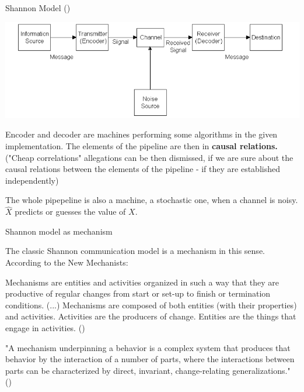 \documentclass[10pt, aspectratio=169, handout]{beamer}
\begin{document}
\begin{frame}[label=shannon_model]{ Shannon Model (\cite{shannon_mathematical_1948})}

    \includegraphics[width=1\linewidth]{images/latexImage_9d58f9e54772e4e91104b2b791c5c63e.png}
    


Encoder and decoder are  machines performing some algorithms  in the given implementation.
The elements of the pipeline are then in \textbf{causal relations.} ("Cheap correlations" allegations can be then dismissed, if we are sure about the causal relations between the elements of the pipeline - if they are established independently)

    The whole pipepeline is also a machine, a stochastic one, when a channel is noisy.
    {$\hat{X}$} predicts or guesses the value of $X$.
   

\end{frame}


\begin{frame}[label=shannon_mechanism]{Shannon model as mechanism}
 
    The classic Shannon communication model  is a mechanism in this sense.
    According to the New Mechanists:

    Mechanisms are entities and activities organized in such a way that they are
    productive of regular changes from start or set-up to finish or termination conditions.
    (...)
    Mechanisms are composed of both entities (with their properties) and
    activities. Activities are the producers of change. Entities are the things
    that engage in activities. (\cite{machamer_thinking_2000})

    
    "A mechanism underpinning a behavior is a complex system that produces
    that behavior by the interaction of a number of parts, where the
    interactions between parts can be characterized by direct, invariant,
    change-relating generalizations." (\cite{glennan_rethinking_2002})

   

\end{frame}
\end{document}
